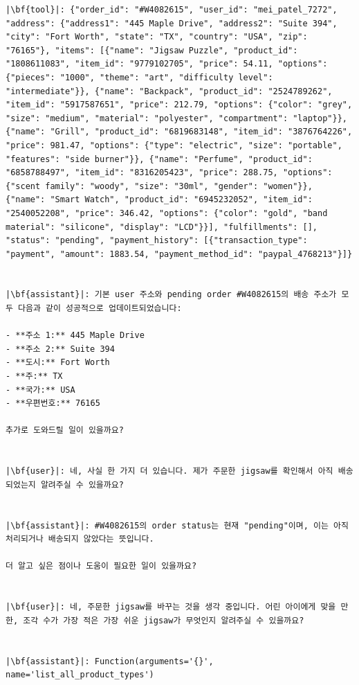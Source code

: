 \begin{verbatim}
|\bf{tool}|: {"order_id": "#W4082615", "user_id": "mei_patel_7272", "address": {"address1": "445 Maple Drive", "address2": "Suite 394", "city": "Fort Worth", "state": "TX", "country": "USA", "zip": "76165"}, "items": [{"name": "Jigsaw Puzzle", "product_id": "1808611083", "item_id": "9779102705", "price": 54.11, "options": {"pieces": "1000", "theme": "art", "difficulty level": "intermediate"}}, {"name": "Backpack", "product_id": "2524789262", "item_id": "5917587651", "price": 212.79, "options": {"color": "grey", "size": "medium", "material": "polyester", "compartment": "laptop"}}, {"name": "Grill", "product_id": "6819683148", "item_id": "3876764226", "price": 981.47, "options": {"type": "electric", "size": "portable", "features": "side burner"}}, {"name": "Perfume", "product_id": "6858788497", "item_id": "8316205423", "price": 288.75, "options": {"scent family": "woody", "size": "30ml", "gender": "women"}}, {"name": "Smart Watch", "product_id": "6945232052", "item_id": "2540052208", "price": 346.42, "options": {"color": "gold", "band material": "silicone", "display": "LCD"}}], "fulfillments": [], "status": "pending", "payment_history": [{"transaction_type": "payment", "amount": 1883.54, "payment_method_id": "paypal_4768213"}]}


|\bf{assistant}|: 기본 user 주소와 pending order #W4082615의 배송 주소가 모두 다음과 같이 성공적으로 업데이트되었습니다:

- **주소 1:** 445 Maple Drive
- **주소 2:** Suite 394
- **도시:** Fort Worth
- **주:** TX
- **국가:** USA
- **우편번호:** 76165

추가로 도와드릴 일이 있을까요?


|\bf{user}|: 네, 사실 한 가지 더 있습니다. 제가 주문한 jigsaw를 확인해서 아직 배송되었는지 알려주실 수 있을까요?


|\bf{assistant}|: #W4082615의 order status는 현재 "pending"이며, 이는 아직 처리되거나 배송되지 않았다는 뜻입니다.

더 알고 싶은 점이나 도움이 필요한 일이 있을까요?


|\bf{user}|: 네, 주문한 jigsaw를 바꾸는 것을 생각 중입니다. 어린 아이에게 맞을 만한, 조각 수가 가장 적은 가장 쉬운 jigsaw가 무엇인지 알려주실 수 있을까요?


|\bf{assistant}|: Function(arguments='{}', name='list_all_product_types')



\end{verbatim}
